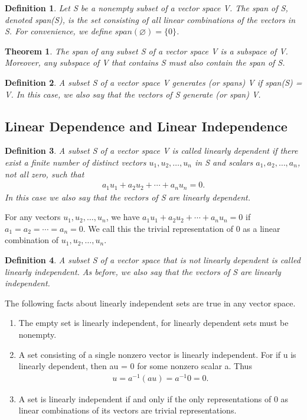 \documentclass{article}
\theoremstyle{plain}
\newtheorem{theorem}{Theorem}[section]
\newtheorem*{definition1}{Definition}
\theoremstyle{plain} %
\begin{document}
\begin{definition1}
Let S be a nonempty subset of a vector space V. The span of S, denoted span(S), is the set consisting of all linear combinations of the vectors in S. For convenience, we define $span(\varnothing) = \{0\}$.
\end{definition1}

\begin{theorem}
The span of any subset S of a vector space V is a subspace of V. Moreover, any subspace of V that contains S must also contain the span of S.
\end{theorem}

\begin{definition1}
A subset S of a vector space V generates (or spans) V if span(S) = V. In this case, we also say that the vectors of S generate (or span) V.
\end{definition1}

\subsection{Linear Dependence and Linear Independence}

\begin{definition1}
A subset S of a vector space V is called linearly dependent if there exist a finite number of distinct vectors $u_1, u_2,\ldots,u_n$ in S and scalars $a_1, a_2,\ldots,a_n$, not all zero, such that
\begin{align*}
a_1u_1 + a_2u_2 + \cdots + a_nu_n = 0 .
\end{align*}
In this case we also say that the vectors of S are linearly dependent.
\end{definition1}

For any vectors $u_1, u_2,\ldots,u_n$, we have $a_1u_1 + a_2u_2 + \cdots + a_nu_n = 0$ if $a_1 = a_2 = \cdots = a_n = 0$. We call this the trivial representation of 0 as a linear combination of $u_1, u_2,\ldots, u_n$.

\begin{definition1}
A subset S of a vector space that is not linearly dependent is called linearly independent. As before, we also say that the vectors of S are linearly independent.
\end{definition1}

The following facts about linearly independent sets are true in any vector
space.
\begin{enumerate}
\item The empty set is linearly independent, for linearly dependent sets must be nonempty.
\item A set consisting of a single nonzero vector is linearly independent. For if {u} is linearly dependent, then au = 0 for some nonzero scalar a. Thus
\begin{align*}
u = a^{-1}(au) = a^{-1}0 = 0 .
\end{align*}
\item A set is linearly independent if and only if the only representations of 0 as linear combinations of its vectors are trivial representations.
\end{enumerate}
\end{document}
